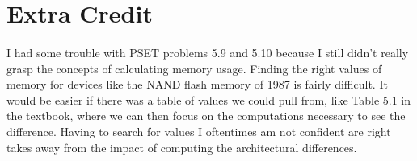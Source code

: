 \documentclass[10pt]{article}
\begin{document}
\section{Extra Credit}
\paragraph{} I had some trouble with PSET problems 5.9 and 5.10 because I still didn't really grasp the concepts of calculating memory usage. Finding the right values of memory for devices 
like the NAND flash memory of 1987 is fairly difficult. It would be easier if there was a table of values we could pull from, like Table 5.1 in the textbook, where we can then focus
on the computations necessary to see the difference. Having to search for values I oftentimes am not confident are right takes away from the impact of computing the architectural differences. 
\end{document}
